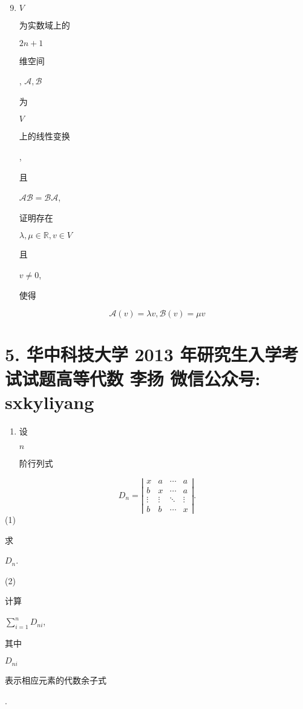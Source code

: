\documentclass[10pt]{article}
\begin{document}
\begin{enumerate}
  \setcounter{enumi}{8}
  \item $V$ \begin{CJK}{UTF8}{mj}为实数域上的\end{CJK} $2 n+1$ \begin{CJK}{UTF8}{mj}维空间\end{CJK}, $\mathscr{A}, \mathscr{B}$ \begin{CJK}{UTF8}{mj}为\end{CJK} $V$ \begin{CJK}{UTF8}{mj}上的线性变换\end{CJK}, \begin{CJK}{UTF8}{mj}且\end{CJK} $\mathscr{A} \mathscr{B}=\mathscr{B} \mathscr{A}$, \begin{CJK}{UTF8}{mj}证明存在\end{CJK} $\lambda, \mu \in \mathbb{R}, v \in V$ \begin{CJK}{UTF8}{mj}且\end{CJK} $v \neq 0$, \begin{CJK}{UTF8}{mj}使得\end{CJK}
\end{enumerate}
$$
\mathscr{A}(v)=\lambda v, \mathscr{B}(v)=\mu v
$$

\section{5. 华中科技大学 2013 年研究生入学考试试题高等代数 
 李扬 
 微信公众号: sxkyliyang}
\begin{enumerate}
  \item \begin{CJK}{UTF8}{mj}设\end{CJK} $n$ \begin{CJK}{UTF8}{mj}阶行列式\end{CJK}
\end{enumerate}
$$
D_{n}=\left|\begin{array}{cccc}
x & a & \cdots & a \\
b & x & \cdots & a \\
\vdots & \vdots & \ddots & \vdots \\
b & b & \cdots & x
\end{array}\right| .
$$
(1) \begin{CJK}{UTF8}{mj}求\end{CJK} $D_{n}$.

(2) \begin{CJK}{UTF8}{mj}计算\end{CJK} $\sum_{i=1}^{n} D_{n i}$, \begin{CJK}{UTF8}{mj}其中\end{CJK} $D_{n i}$ \begin{CJK}{UTF8}{mj}表示相应元素的代数余子式\end{CJK}.
\end{document}
